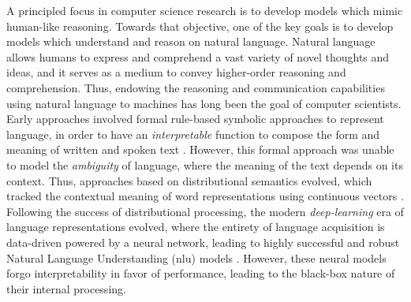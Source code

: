 \documentclass[letterpaper, 12pt]{report}
\begin{document}
A principled focus in computer science research is to develop models which mimic human-like reasoning. Towards that objective, one of the key goals is to develop models which understand and reason on natural language. Natural language allows humans to express and comprehend a vast variety of novel thoughts and ideas, and it serves as a medium to convey higher-order reasoning and comprehension. Thus, endowing the reasoning and communication capabilities using natural language to machines has long been the goal of computer scientists. Early approaches involved formal rule-based symbolic approaches to represent language, in order to have an \textit{interpretable} function to compose the form and meaning of written and spoken text \citep{chomsky1957syntactic,van1995language,van2008brief,MacCartney2009-sz}. However, this formal approach was unable to model the \textit{ambiguity} of language, where the meaning of the text depends on its context. Thus, approaches based on distributional semantics evolved, which tracked the contextual meaning of word representations using continuous vectors \citep{mikolov2013efficient,pennington2014glove}. Following the success of distributional processing, the modern \textit{deep-learning} era of language representations evolved, where the entirety of language acquisition is data-driven powered by a neural network, leading to highly successful and robust Natural Language Understanding (\acrshort{nlu}) models \citep{rosenblatt1958perceptron,rumelhart1986learning,hinton2006fast,bengio2006greedy,hochreiter1997long,cho2014learning,kim-2014-convolutional,bahdanau2014neural}. However, these neural models forgo interpretability in favor of performance, leading to the black-box nature of their internal processing.

\end{document}
